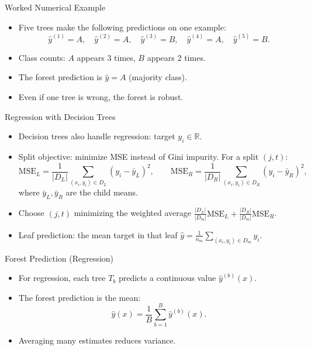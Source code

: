 \begin{frame}{Worked Numerical Example}
\small
\begin{itemize}
  \item Five trees make the following predictions on one example:
  \[
    \hat{y}^{(1)} = A,\quad
    \hat{y}^{(2)} = A,\quad
    \hat{y}^{(3)} = B,\quad
    \hat{y}^{(4)} = A,\quad
    \hat{y}^{(5)} = B.
  \]
  \pause
  \item Class counts: $A$ appears 3 times, $B$ appears 2 times.
  \pause
  \item The forest prediction is $\hat{y} = A$ (majority class).
  \pause
  \item Even if one tree is wrong, the forest is robust.
\end{itemize}
\end{frame}

\begin{frame}{Regression with Decision Trees}
\begin{itemize}
  \item Decision trees also handle regression: target $y_i\in\mathbb{R}$.
  \pause
  \item Split objective: minimize MSE instead of Gini impurity. For a split $(j,t)$:
  \[
    \text{MSE}_L=\frac{1}{|D_L|}\sum_{(x_i,y_i)\in D_L}(y_i-\bar{y}_L)^2,\qquad
    \text{MSE}_R=\frac{1}{|D_R|}\sum_{(x_i,y_i)\in D_R}(y_i-\bar{y}_R)^2,
  \]
  where $\bar{y}_L,\bar{y}_R$ are the child means.
  \pause
  \item Choose $(j,t)$ minimizing the weighted average $\displaystyle\frac{|D_L|}{|D_m|}\text{MSE}_L+\frac{|D_R|}{|D_m|}\text{MSE}_R$.
  \pause
  \item Leaf prediction: the mean target in that leaf $\displaystyle\hat{y}=\frac{1}{n_m}\sum_{(x_i,y_i)\in D_m}y_i$.
\end{itemize}
\end{frame}

\begin{frame}{Forest Prediction (Regression)}
\begin{itemize}
  \item For regression, each tree $T_b$ predicts a continuous value $\hat{y}^{(b)}(x)$.
  \pause
  \item The forest prediction is the mean:
  \begin{equation}
    \hat{y}(x) = \frac{1}{B}\sum_{b=1}^{B}\hat{y}^{(b)}(x).
    \label{eq:forest-mean}
  \end{equation}
  \pause
  \item Averaging many estimates reduces variance.
\end{itemize}
\end{frame}

